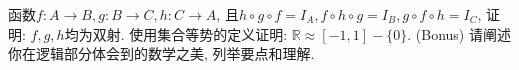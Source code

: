 \documentclass{exam}
\begin{document}
\begin{questions}
    \question[6]函数$f: A \rightarrow B, g: B \rightarrow C, h: C \rightarrow A$, 且$h \circ g \circ f=I_A, f \circ h \circ g=I_B, g \circ f \circ h=I_C$, 证明: $f, g, h$均为双射.
    \question[13]使用集合等势的定义证明: $\mathbb{R} \approx [-1, 1] - \{0\}$.
    \question[2](Bonus) 请阐述你在逻辑部分体会到的数学之美, 列举要点和理解.
\end{questions}
\end{document}

